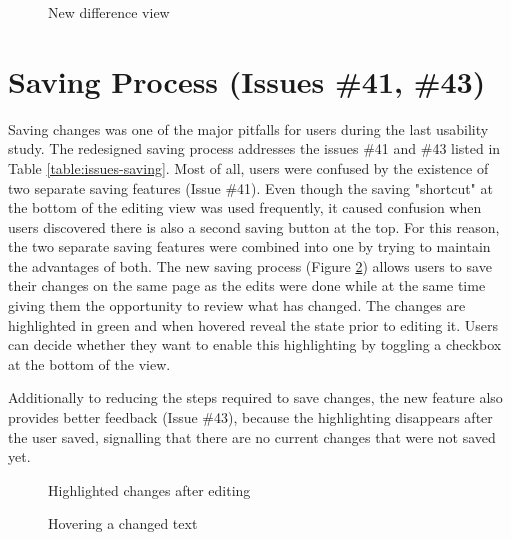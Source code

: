\begin{figure}[h!]
 \centering
 \caption{New difference view}
 \label{fig:diff-split}
\end{figure}

\section{Saving Process (Issues \#41, \#43)}
Saving changes was one of the major pitfalls for users during the last usability study. The redesigned saving process addresses the issues \#41 and \#43 listed in Table \ref{table:issues-saving}. Most of all, users were confused by the existence of two separate saving features (Issue \#41). Even though the saving "shortcut" at the bottom of the editing view was used frequently, it caused confusion when users discovered there is also a second saving button at the top. For this reason, the two separate saving features were combined into one by trying to maintain the advantages of both. The new saving process (Figure \ref{fig:highlighted-changes}) allows users to save their changes on the same page as the edits were done while at the same time giving them the opportunity to review what has changed. The changes are highlighted in green and when hovered reveal the state prior to editing it. Users can decide whether they want to enable this highlighting by toggling a checkbox at the bottom of the view.

Additionally to reducing the steps required to save changes, the new feature also provides better feedback (Issue \#43), because the highlighting disappears after the user saved, signalling that there are no current changes that were not saved yet.



\begin{figure}[h!]
 \centering
 \caption{Highlighted changes after editing}
 \label{fig:highlighted-changes}
\end{figure}

\begin{figure}[h!]
 \centering
 \caption{Hovering a changed text}
 \label{fig:hover-changed-text}
\end{figure}

